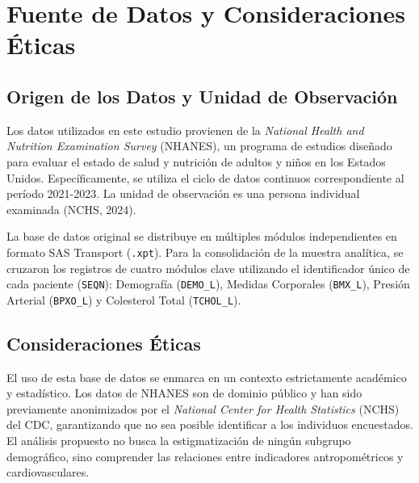 \section{Fuente de Datos y Consideraciones Éticas}

\subsection{Origen de los Datos y Unidad de Observación}
Los datos utilizados en este estudio provienen de la \textit{National Health and Nutrition Examination Survey} (NHANES), un programa de estudios diseñado para evaluar el estado de salud y nutrición de adultos y niños en los Estados Unidos. Específicamente, se utiliza el ciclo de datos continuos correspondiente al período 2021-2023. La unidad de observación es una persona individual examinada (NCHS, 2024). 

La base de datos original se distribuye en múltiples módulos independientes en formato SAS Transport (\texttt{.xpt}). Para la consolidación de la muestra analítica, se cruzaron los registros de cuatro módulos clave utilizando el identificador único de cada paciente (\texttt{SEQN}): Demografía (\texttt{DEMO\_L}), Medidas Corporales (\texttt{BMX\_L}), Presión Arterial (\texttt{BPXO\_L}) y Colesterol Total (\texttt{TCHOL\_L}).

\subsection{Consideraciones Éticas}
El uso de esta base de datos se enmarca en un contexto estrictamente académico y estadístico. Los datos de NHANES son de dominio público y han sido previamente anonimizados por el \textit{National Center for Health Statistics} (NCHS) del CDC, garantizando que no sea posible identificar a los individuos encuestados. El análisis propuesto no busca la estigmatización de ningún subgrupo demográfico, sino comprender las relaciones entre indicadores antropométricos y cardiovasculares.
